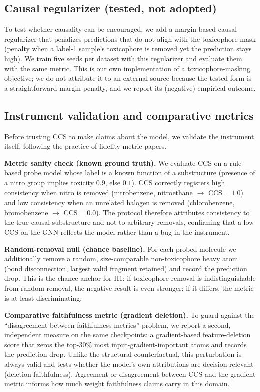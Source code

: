 \documentclass[a4paper,fleqn]{cas-dc}
\begin{document}
\subsection{Causal regularizer (tested, not adopted)}
To test whether causality can be encouraged, we add a margin-based causal regularizer that penalizes predictions that do not align with the toxicophore mask (penalty when a label-1 sample's toxicophore is removed yet the prediction stays high). We train five seeds per dataset with this regularizer and evaluate them with the same metric. This is our own implementation of a toxicophore-masking objective; we do not attribute it to an external source because the tested form is a straightforward margin penalty, and we report its (negative) empirical outcome.

\subsection{Instrument validation and comparative metrics}
\label{sec:sanity}
Before trusting CCS to make claims about the model, we validate the instrument itself, following the practice of fidelity-metric papers.

\textbf{Metric sanity check (known ground truth).} We evaluate CCS on a rule-based probe model whose label is a known function of a substructure (presence of a nitro group implies toxicity $0.9$, else $0.1$). CCS correctly registers high consistency when nitro is removed (nitrobenzene, nitroethane $\to$ CCS$=1.0$) and low consistency when an unrelated halogen is removed (chlorobenzene, bromobenzene $\to$ CCS$=0.0$). The protocol therefore attributes consistency to the true causal substructure and not to arbitrary removals, confirming that a low CCS on the GNN reflects the model rather than a bug in the instrument.

\textbf{Random-removal null (chance baseline).} For each probed molecule we additionally remove a random, size-comparable non-toxicophore heavy atom (bond disconnection, largest valid fragment retained) and record the prediction drop. This is the chance anchor for H1: if toxicophore removal is indistinguishable from random removal, the negative result is even stronger; if it differs, the metric is at least discriminating.

\textbf{Comparative faithfulness metric (gradient deletion).} To guard against the ``disagreement between faithfulness metrics'' problem, we report a second, independent measure on the same checkpoints: a gradient-based feature-deletion score that zeros the top-$30\%$ most input-gradient-important atoms and records the prediction drop. Unlike the structural counterfactual, this perturbation is always valid and tests whether the model's own attributions are decision-relevant (deletion faithfulness). Agreement or disagreement between CCS and the gradient metric informs how much weight faithfulness claims carry in this domain.
\end{document}
